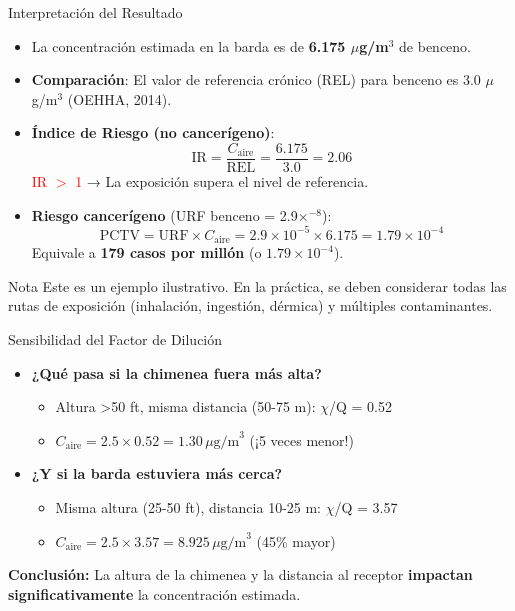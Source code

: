 \documentclass[10pt,compress]{beamer}
\begin{document}
\begin{frame}{Interpretación del Resultado}
\begin{itemize}
\item La concentración estimada en la barda es de \textbf{6.175 $\mu$g/m$^3$} de benceno.
\item \textbf{Comparación}: El valor de referencia crónico (REL) para benceno es 3.0 $\mu$g/m$^3$ (OEHHA, 2014).
\item \textbf{Índice de Riesgo (no cancerígeno)}:
\[
\text{IR} = \frac{C_{\text{aire}}}{\text{REL}} = \frac{6.175}{3.0} = 2.06
\]
\textcolor{red}{IR $>$ 1} → La exposición supera el nivel de referencia.
\item \textbf{Riesgo cancerígeno} (URF benceno = 2.9×$^{-8}$):
\[
\text{PCTV} = \text{URF} \times C_{\text{aire}} = 2.9\times10^{-5} \times 6.175 = 1.79\times10^{-4}
\]
Equivale a \textbf{179 casos por millón} (o $1.79 \times 10^{-4}$).
\end{itemize}
\vspace{0.2cm}
\begin{alertblock}{Nota}
Este es un ejemplo ilustrativo. En la práctica, se deben considerar todas las rutas de exposición (inhalación, ingestión, dérmica) y múltiples contaminantes.
\end{alertblock}
\end{frame}

\begin{frame}{Sensibilidad del Factor de Dilución}
\begin{itemize}
\item \textbf{¿Qué pasa si la chimenea fuera más alta?}
\begin{itemize}
\item Altura >50 ft, misma distancia (50-75 m): $\chi$/Q = 0.52
\item \(C_{\text{aire}} = 2.5 \times 0.52 = 1.30 \, \mu\text{g/m}^3\) (¡5 veces menor!)
\end{itemize}
\item \textbf{¿Y si la barda estuviera más cerca?}
\begin{itemize}
\item Misma altura (25-50 ft), distancia 10-25 m: $\chi$/Q = 3.57
\item \(C_{\text{aire}} = 2.5 \times 3.57 = 8.925 \, \mu\text{g/m}^3\) (45\% mayor)
\end{itemize}
\end{itemize}
\vspace{0.3cm}
\begin{center}
\color{blue}
\textbf{Conclusión:} La altura de la chimenea y la distancia al receptor \textbf{impactan significativamente} la concentración estimada.
\end{center}
\end{frame}
\end{document}
